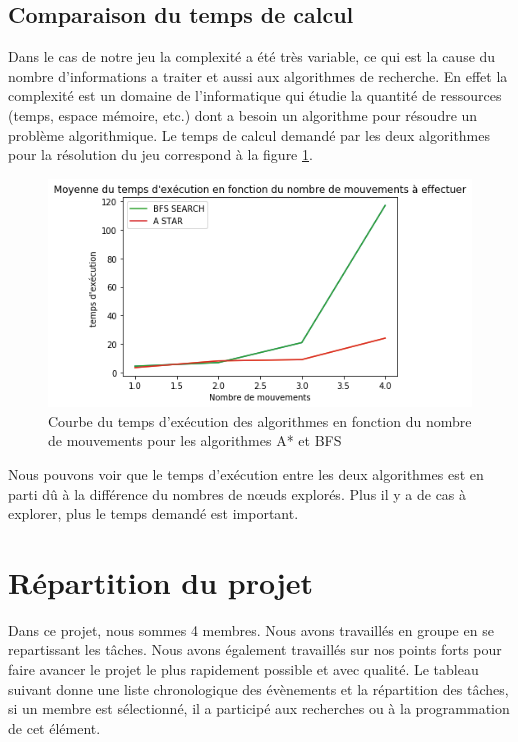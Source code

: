 \documentclass[a4paper]{article} %
\begin{document}
	\subsection{Comparaison du temps de calcul}
Dans le cas de notre jeu la complexité a été très variable, ce qui est la cause du nombre d'informations a traiter et aussi aux algorithmes de recherche. En effet  la complexité est un domaine de l'informatique qui étudie la quantité de ressources (temps, espace mémoire, etc.) dont a besoin un algorithme pour résoudre un problème algorithmique. Le temps de calcul demandé par les deux algorithmes pour la résolution du jeu correspond à la figure \ref{calcul}.

\begin{figure}[htpb]
	\begin{center}
	\includegraphics[scale=0.5]{./images/time.png}
	\caption{Courbe du temps d’exécution des algorithmes  en fonction du  nombre de mouvements pour les algorithmes A* et BFS}\label{calcul}
	\end{center}
\end{figure}

Nous pouvons voir que le temps d’exécution entre les deux algorithmes est en parti dû à la différence du  nombres de nœuds explorés. Plus il y a de cas à explorer, plus le temps demandé est important.

\section{Répartition du projet}
Dans ce projet, nous sommes 4 membres. Nous avons travaillés en groupe en se repartissant les tâches. Nous avons également travaillés sur nos points forts pour faire avancer le projet le plus rapidement possible et avec qualité.
Le tableau suivant donne une liste chronologique des évènements et la répartition des tâches, si un membre est sélectionné, il a participé aux recherches ou à la programmation de cet élément.
\end{document}
